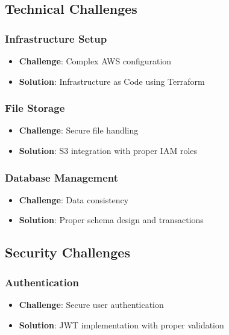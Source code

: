 \documentclass[12pt,a4paper]{article}
\begin{document}
\subsection{Technical Challenges}

\subsubsection{Infrastructure Setup}
\begin{itemize}
    \item \textbf{Challenge}: Complex AWS configuration
    \item \textbf{Solution}: Infrastructure as Code using Terraform
\end{itemize}

\subsubsection{File Storage}
\begin{itemize}
    \item \textbf{Challenge}: Secure file handling
    \item \textbf{Solution}: S3 integration with proper IAM roles
\end{itemize}

\subsubsection{Database Management}
\begin{itemize}
    \item \textbf{Challenge}: Data consistency
    \item \textbf{Solution}: Proper schema design and transactions
\end{itemize}

\subsection{Security Challenges}

\subsubsection{Authentication}
\begin{itemize}
    \item \textbf{Challenge}: Secure user authentication
    \item \textbf{Solution}: JWT implementation with proper validation
\end{itemize}
\end{document}
